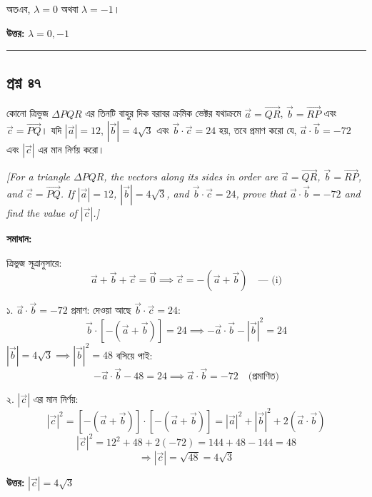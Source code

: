 \documentclass[11pt,a4paper]{article}
\begin{document}
অতএব, $\lambda = 0$ অথবা $\lambda = -1$।

\textbf{উত্তর:} $\lambda = 0, -1$

\vspace{0.5cm}
\hrule
\vspace{0.5cm}

\subsection*{প্রশ্ন ৪৭}

কোনো ত্রিভুজ $\Delta PQR$ এর তিনটি বাহুর দিক বরাবর ক্রমিক ভেক্টর যথাক্রমে $\vec{a} = \vec{QR}$, $\vec{b} = \vec{RP}$ এবং $\vec{c} = \vec{PQ}$। যদি $|\vec{a}| = 12$, $|\vec{b}| = 4\sqrt{3}$ এবং $\vec{b} \cdot \vec{c} = 24$ হয়, তবে প্রমাণ করো যে, $\vec{a} \cdot \vec{b} = -72$ এবং $|\vec{c}|$ এর মান নির্ণয় করো।

\smallskip
\textit{[For a triangle $\Delta PQR$, the vectors along its sides in order are $\vec{a} = \vec{QR}$, $\vec{b} = \vec{RP}$, and $\vec{c} = \vec{PQ}$. If $|\vec{a}| = 12$, $|\vec{b}| = 4\sqrt{3}$, and $\vec{b} \cdot \vec{c} = 24$, prove that $\vec{a} \cdot \vec{b} = -72$ and find the value of $|\vec{c}|$.]}

\vspace{0.3cm}
\begin{center}
\end{center}

\textbf{সমাধান:}

ত্রিভুজ সূত্রানুসারে:
$$\vec{a} + \vec{b} + \vec{c} = \vec{0} \implies \vec{c} = -(\vec{a} + \vec{b}) \quad \text{--- (i)}$$

১. $\vec{a} \cdot \vec{b} = -72$ প্রমাণ:
দেওয়া আছে $\vec{b} \cdot \vec{c} = 24$:
$$\vec{b} \cdot [-(\vec{a} + \vec{b})] = 24 \implies -\vec{a} \cdot \vec{b} - |\vec{b}|^2 = 24$$
$|\vec{b}| = 4\sqrt{3} \implies |\vec{b}|^2 = 48$ বসিয়ে পাই:
$$-\vec{a} \cdot \vec{b} - 48 = 24 \implies \vec{a} \cdot \vec{b} = -72 \quad \text{(প্রমাণিত)}$$

২. $|\vec{c}|$ এর মান নির্ণয়:
$$|\vec{c}|^2 = [-(\vec{a} + \vec{b})] \cdot [-(\vec{a} + \vec{b})] = |\vec{a}|^2 + |\vec{b}|^2 + 2(\vec{a} \cdot \vec{b})$$
$$|\vec{c}|^2 = 12^2 + 48 + 2(-72) = 144 + 48 - 144 = 48$$
$$\Rightarrow |\vec{c}| = \sqrt{48} = 4\sqrt{3}$$

\textbf{উত্তর:} $|\vec{c}| = 4\sqrt{3}$
\end{document}
